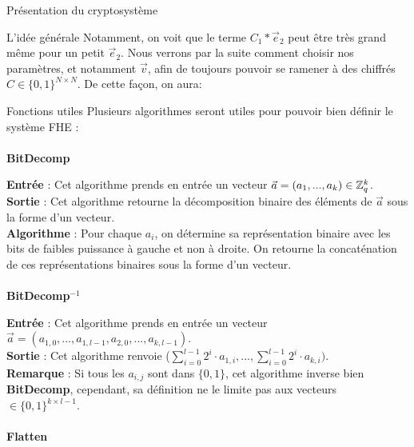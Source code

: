\begin{section}{Présentation du cryptosystème}
\begin{subsection}{L'idée générale}
	Notamment, on voit que le terme $C_1 * \vec{e}_2$ peut être très grand 
	même pour un petit $\vec{e}_2$. Nous verrons par la suite comment
	choisir nos paramètres, et notamment $\vec{v}$, afin de 
	toujours pouvoir se ramener à des chiffrés $C \in \{0,1\}^{N
	\times N}$. De cette façon, on aura:

	
	
	




	\end{subsection}
	\begin{subsection}{Fonctions utiles}
	Plusieurs algorithmes seront utiles pour pouvoir bien définir le système FHE :
	
	\paragraph{}
	\textbf{BitDecomp}
	\flushleft

	\textbf{Entrée} : Cet algorithme prends en entrée un vecteur $\vec{a} = (a_1, ..., a_k) \in \mathbb{Z}_q^{k}$. \\
	\textbf{Sortie} : Cet algorithme retourne la décomposition binaire des éléments de $\vec{a}$ sous la forme d'un vecteur. \\
	\textbf{Algorithme} : Pour chaque $a_i$, on détermine sa représentation binaire avec les bits de faibles puissance à gauche et non à droite. On retourne la concaténation de ces représentations binaires sous la forme d'un vecteur.
	
	\paragraph{}
	\textbf{BitDecomp}$^{-1}$
	\flushleft

	\textbf{Entrée} : Cet algorithme prends en entrée un vecteur $\vec{a} = (a_{1,0}, ..., a_{1,l-1}, a_{2,0}, ..., a_{k,l-1})$. \\
	\textbf{Sortie} : Cet algorithme renvoie ($\sum\limits_{i=0}^{l-1} 2^{i} \cdot a_{1,i}, ..., \sum\limits_{i=0}^{l-1} 2^{i} \cdot a_{k,i})$. \\
	\textbf{Remarque} : Si tous les $a_{i,j}$ sont dans $\{ 0,1 \} $, cet algorithme inverse bien \textbf{BitDecomp}, cependant, sa définition ne le limite pas aux vecteurs $\in \{ 0,1\} ^{k\times l-1}$.

	\paragraph{}
	\textbf{Flatten}
	\flushleft


\end{subsection}
\end{section}
